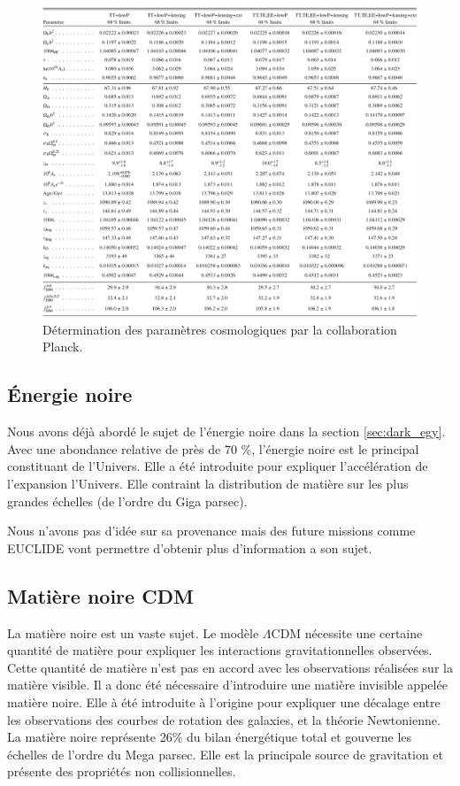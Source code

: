 

\begin{figure}[bth]
        \includegraphics[width=.95\linewidth]{img/01/table_planck.pdf} 
        \caption{Détermination des paramètres cosmologiques par la collaboration Planck.}
 		\label{fig:planck_parameters}
\end{figure}



\subsection{Énergie noire}
Nous avons déjà abordé le sujet de l'énergie noire dans la section \ref{sec:dark_egy}.
Avec une abondance relative de près de 70 \%, l'énergie noire est le principal constituant de l'Univers.
Elle a été introduite pour expliquer l'accélération de l'expansion l'Univers.
Elle contraint la distribution de matière sur les plus grandes échelles (de l'ordre du Giga parsec).

Nous n'avons pas d'idée sur sa provenance mais des future missions comme EUCLIDE %
vont permettre d'obtenir plus d'information a son sujet.


\subsection{Matière noire CDM}

La matière noire est un vaste sujet.
Le modèle $\Lambda$CDM nécessite une certaine quantité de matière pour expliquer les interactions gravitationnelles observées.
Cette quantité de matière n'est pas en accord avec les observations réalisées sur la matière visible.
Il a donc été nécessaire d’introduire une matière invisible appelée matière noire.
Elle à été introduite à l'origine pour expliquer une décalage entre les observations des courbes de rotation des galaxies, et la théorie Newtonienne.
La matière noire représente 26\% du bilan énergétique total et gouverne les échelles de l'ordre du Mega parsec.
Elle est la principale source de gravitation et présente des propriétés non collisionnelles.

